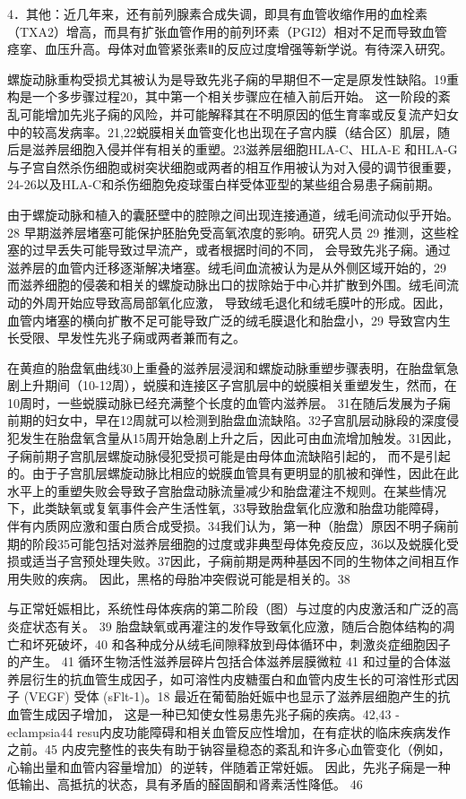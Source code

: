 4．其他：近几年来，还有前列腺素合成失调，即具有血管收缩作用的血栓素（TXA2）增高，而具有扩张血管作用的前列环素（PGI2）相对不足而导致血管痉挛、血压升高。母体对血管紧张素Ⅱ的反应过度增强等新学说。有待深入研究。


螺旋动脉重构受损尤其被认为是导致先兆子痫的早期但不一定是原发性缺陷。19重构是一个多步骤过程20，其中第一个相关步骤应在植入前后开始。
这一阶段的紊乱可能增加先兆子痫的风险，并可能解释其在不明原因的低生育率或反复流产妇女中的较高发病率。21,22蜕膜相关血管变化也出现在子宫内膜（结合区）肌层，随后是滋养层细胞入侵并伴有相关的重塑。23滋养层细胞HLA-C、HLA-E
和HLA-G与子宫自然杀伤细胞或树突状细胞或两者的相互作用被认为对入侵的调节很重要，24-26以及HLA-C和杀伤细胞免疫球蛋白样受体亚型的某些组合易患子痫前期。

由于螺旋动脉和植入的囊胚壁中的腔隙之间出现连接通道，绒毛间流动似乎开始。28 早期滋养层堵塞可能保护胚胎免受高氧浓度的影响。研究人员 29 推测，这些栓塞的过早丢失可能导致过早流产，或者根据时间的不同，
会导致先兆子痫。通过滋养层的血管内迁移逐渐解决堵塞。绒毛间血流被认为是从外侧区域开始的，29 而滋养细胞的侵袭和相关的螺旋动脉出口的拔除始于中心并扩散到外围。绒毛间流动的外周开始应导致高局部氧化应激，
导致绒毛退化和绒毛膜叶的形成。因此，血管内堵塞的横向扩散不足可能导致广泛的绒毛膜退化和胎盘小，29 导致宫内生长受限、早发性先兆子痫或两者兼而有之。

在黄疸的胎盘氧曲线30上重叠的滋养层浸润和螺旋动脉重塑步骤表明，在胎盘氧急剧上升期间（10-12周），蜕膜和连接区子宫肌层中的蜕膜相关重塑发生，然而，在10周时，一些蜕膜动脉已经充满整个长度的血管内滋养层。
31在随后发展为子痫前期的妇女中，早在12周就可以检测到胎盘血流缺陷。32子宫肌层动脉段的深度侵犯发生在胎盘氧含量从15周开始急剧上升之后，因此可由血流增加触发。31因此，子痫前期子宫肌层螺旋动脉侵犯受损可能是由母体血流缺陷引起的，
而不是引起的。由于子宫肌层螺旋动脉比相应的蜕膜血管具有更明显的肌被和弹性，因此在此水平上的重塑失败会导致子宫胎盘动脉流量减少和胎盘灌注不规则。在某些情况下，此类缺氧或复氧事件会产生活性氧，33导致胎盘氧化应激和胎盘功能障碍，
伴有内质网应激和蛋白质合成受损。34我们认为，第一种（胎盘）原因不明子痫前期的阶段35可能包括对滋养层细胞的过度或非典型母体免疫反应，36以及蜕膜化受损或适当子宫预处理失败。37因此，子痫前期是两种基因不同的生物体之间相互作用失败的疾病。
因此，黑格的母胎冲突假说可能是相关的。38

与正常妊娠相比，系统性母体疾病的第二阶段（图）与过度的内皮激活和广泛的高炎症状态有关。 39 胎盘缺氧或再灌注的发作导致氧化应激，随后合胞体结构的凋亡和坏死破坏，40 和各种成分从绒毛间隙释放到母体循环中，刺激炎症细胞因子的产生。
 41 循环生物活性滋养层碎片包括合体滋养层膜微粒 41 和过量的合体滋养层衍生的抗血管生成因子，如可溶性内皮糖蛋白和血管内皮生长的可溶性形式因子 (VEGF) 受体 (sFlt-1)。18 最近在葡萄胎妊娠中也显示了滋养层细胞产生的抗血管生成因子增加，
 这是一种已知使女性易患先兆子痫的疾病。42,43 -eclampsia44 resu内皮功能障碍和相关血管反应性增加，在有症状的临床疾病发作之前。45 内皮完整性的丧失有助于钠容量稳态的紊乱和许多心血管变化（例如，心输出量和血管内容量增加）的逆转，伴随着正常妊娠。
 因此，先兆子痫是一种低输出、高抵抗的状态，具有矛盾的醛固酮和肾素活性降低。 46


